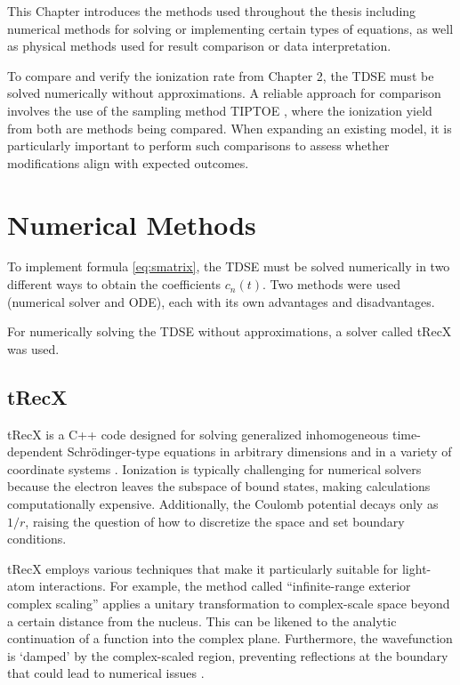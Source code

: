 This Chapter introduces the methods used throughout the thesis including numerical methods for solving or implementing certain types of equations, as well as physical methods used for result comparison or data interpretation.


To compare and verify the ionization rate from Chapter 2, the TDSE must be solved numerically without approximations.
A reliable approach for comparison involves the use of the sampling method TIPTOE \cite{Park:18}, where the ionization yield from both are methods being compared.
When expanding an existing model, it is particularly important to perform such comparisons to assess whether modifications align with expected outcomes.

\section{Numerical Methods}
To implement formula \eqref{eq:smatrix}, the TDSE must be solved numerically in two different ways to obtain the coefficients $c_n(t)$.  
Two methods were used (numerical solver and ODE), each with its own advantages and disadvantages.  

For numerically solving the TDSE without approximations, a solver called tRecX was used.  


\subsection{tRecX}
tRecX is a C++ code designed for solving generalized inhomogeneous time-dependent Schrödinger-type equations in arbitrary dimensions and in a variety of coordinate systems \cite{Scrinzi_trecx}.
Ionization is typically challenging for numerical solvers because the electron leaves the subspace of bound states, making calculations computationally expensive.
Additionally, the Coulomb potential decays only as $1/r$, raising the question of how to discretize the space and set boundary conditions.

tRecX employs various techniques that make it particularly suitable for light-atom interactions.
For example, the method called ``infinite-range exterior complex scaling'' applies a unitary transformation to complex-scale space beyond a certain distance from the nucleus.
This can be likened to the analytic continuation of a function into the complex plane.
Furthermore, the wavefunction is `damped' by the complex-scaled region, preventing reflections at the boundary that could lead to numerical issues \cite{scrinzi_irecs}.

